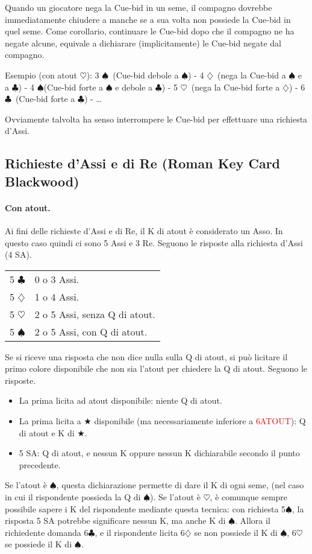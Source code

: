 \documentclass[a4paper,10pt]{article}
\renewcommand{\c}{$\clubsuit$\xspace}
\renewcommand{\d}{$\diamondsuit$\xspace}
\newcommand{\h}{$\heartsuit$\xspace}
\newcommand{\s}{$\spadesuit$\xspace}
\renewcommand{\j}{$\bigstar$\xspace}
\newcommand{\sa}{SA\xspace}
\newcommand{\smallspace}{\vskip0.3cm}
\newcommand{\note}[1]{\textcolor{red}{#1}}
\newenvironment{twocol}
  {\smallspace\noindent\begin{tabular}{l p{0.8\textwidth}}}
  {\end{tabular}\smallspace}
\begin{document}
Quando un giocatore nega la Cue-bid in un seme, il compagno dovrebbe immediatamente chiudere a manche se a sua volta non possiede la Cue-bid in quel seme.
Come corollario, continuare le Cue-bid dopo che il compagno ne ha negate alcune, equivale a dichiarare (implicitamente) le Cue-bid negate dal compagno.

Esempio (con atout \h): 3 \s\  (Cue-bid debole a \s) - 4 \d\ (nega la Cue-bid a \s e a \c) - 4 \s (Cue-bid forte a \s e debole a \c) - 5 \h\ (nega la Cue-bid forte a \d) - 6 \c\ (Cue-bid forte a \c) - \dots

Ovviamente talvolta ha senso interrompere le Cue-bid per effettuare una richiesta d'Assi.


\subsection{Richieste d'Assi e di Re (Roman Key Card Blackwood)}

\paragraph{Con atout.} Ai fini delle richieste d'Assi e di Re, il K di atout \`e considerato un Asso. In questo caso quindi ci sono 5 Assi e 3 Re. Seguono le risposte alla richiesta d'Assi (4 \sa).
\begin{twocol}
5 \c & 0 o 3 Assi.\\
5 \d & 1 o 4 Assi.\\
5 \h & 2 o 5 Assi, senza Q di atout.\\
5 \s & 2 o 5 Assi, con Q di atout.\\
\end{twocol}

\noindent Se si riceve una risposta che non dice nulla sulla Q di atout, si può licitare il primo colore disponibile che non sia l'atout per chiedere la Q di atout. Seguono le risposte.

\begin{itemize}
 \item La prima licita ad atout disponibile: niente Q di atout.
 \item La prima licita a \j disponibile (ma necessariamente inferiore a \note{6ATOUT}): Q di atout e K di \j.
 \item 5 \sa: Q di atout, e nessun K oppure nessun K dichiarabile secondo il punto precedente.
\end{itemize}

Se l'atout è \s, questa dichiarazione permette di dare il K di ogni seme, (nel caso in cui il rispondente possieda la Q di \s). Se l'atout è \h, è comunque sempre possibile sapere i K del rispondente mediante questa tecnica: con richiesta 5\s, la risposta 5 \sa potrebbe significare nessun K, ma anche K di \s.
Allora il richiedente domanda 6\c, e il rispondente licita 6\d se non possiede il K di \s, 6\h se possiede il K di \s.
\end{document}
